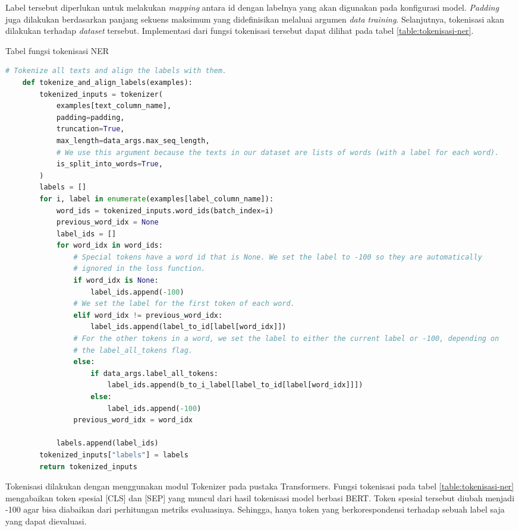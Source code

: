 Label tersebut diperlukan untuk melakukan \textit{mapping} antara id dengan labelnya yang akan digunakan pada konfigurasi model. \textit{Padding} juga dilakukan berdasarkan panjang sekuens maksimum yang didefinisikan melaluai argumen \textit{data training}. Selanjutnya, tokenisasi akan dilakukan terhadap \textit{dataset} tersebut. Implementasi dari fungsi tokenisasi tersebut dapat dilihat pada tabel \ref{table:tokenisasi-ner}.

\begin{table}
    \caption{Tabel fungsi tokenisasi NER}
    \label{table:tokenisasi-ner}
    \begin{lstlisting}[language=python]
    # Tokenize all texts and align the labels with them.
    def tokenize_and_align_labels(examples):
        tokenized_inputs = tokenizer(
            examples[text_column_name],
            padding=padding,
            truncation=True,
            max_length=data_args.max_seq_length,
            # We use this argument because the texts in our dataset are lists of words (with a label for each word).
            is_split_into_words=True,
        )
        labels = []
        for i, label in enumerate(examples[label_column_name]):
            word_ids = tokenized_inputs.word_ids(batch_index=i)
            previous_word_idx = None
            label_ids = []
            for word_idx in word_ids:
                # Special tokens have a word id that is None. We set the label to -100 so they are automatically
                # ignored in the loss function.
                if word_idx is None:
                    label_ids.append(-100)
                # We set the label for the first token of each word.
                elif word_idx != previous_word_idx:
                    label_ids.append(label_to_id[label[word_idx]])
                # For the other tokens in a word, we set the label to either the current label or -100, depending on
                # the label_all_tokens flag.
                else:
                    if data_args.label_all_tokens:
                        label_ids.append(b_to_i_label[label_to_id[label[word_idx]]])
                    else:
                        label_ids.append(-100)
                previous_word_idx = word_idx

            labels.append(label_ids)
        tokenized_inputs["labels"] = labels
        return tokenized_inputs
    \end{lstlisting}
\end{table}

Tokenisasi dilakukan dengan menggunakan modul Tokenizer pada pustaka Transformers. Fungsi tokenisasi pada tabel \ref{table:tokenisasi-ner} mengabaikan token spesial [CLS] dan [SEP] yang muncul dari hasil tokenisasi model berbasi BERT. Token spesial tersebut diubah menjadi -100 agar bisa diabaikan dari perhitungan metriks evaluasinya. Sehingga, hanya token yang berkorespondensi terhadap sebuah label saja yang dapat dievaluasi.


